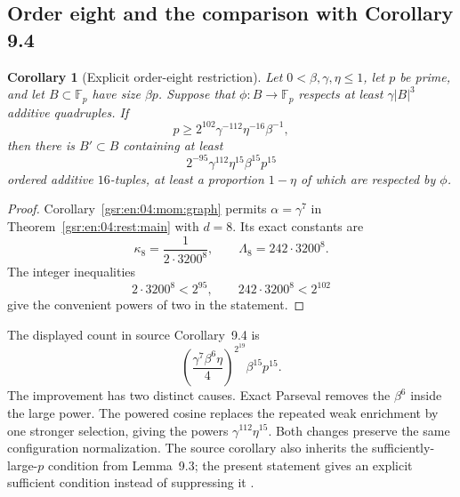 \documentclass[11pt,letterpaper]{article}
\numberwithin{equation}{section}
\newtheorem{corollary}[theorem]{Corollary}
\theoremstyle{definition}
\theoremstyle{remark}
\newcommand{\F}{\mathbb F}
\newcommand{\1}{\mathbf 1}
\newcommand{\abs}[1]{\left|#1\right|}
\begin{document}
\subsection{Order eight and the comparison with Corollary 9.4}

\begin{corollary}[Explicit order-eight restriction]
\label{gsr:en:04:rest:eight}
Let \(0<\beta,\gamma,\eta\leq1\), let \(p\) be prime, and let
\(B\subset\F_p\) have size \(\beta p\).  Suppose that
\(\phi:B\to\F_p\) respects at least
\(\gamma\abs B^3\) additive quadruples.  If
\[
 \boxed{\quad
 p\geq2^{102}\gamma^{-112}\eta^{-16}\beta^{-1},
 \quad}
 \tag{R27}
\]
then there is \(B'\subset B\) containing at least
\[
 \boxed{\quad
 2^{-95}\gamma^{112}\eta^{15}\beta^{15}p^{15}
 \quad}
 \tag{R28}
\]
ordered additive \(16\)-tuples, at least a proportion
\(1-\eta\) of which are respected by \(\phi\).
\end{corollary}

\begin{proof}
Corollary~\ref{gsr:en:04:mom:graph} permits
\(\alpha=\gamma^7\) in Theorem~\ref{gsr:en:04:rest:main} with \(d=8\).
Its exact constants are
\[
 \kappa_8=\frac1{2\cdot3200^8},\qquad
 \Lambda_8=242\cdot3200^8.
 \tag{R29}
\]
The integer inequalities
\[
 2\cdot3200^8<2^{95},\qquad
 242\cdot3200^8<2^{102}
 \tag{R30}
\]
give the convenient powers of two in the statement.
\end{proof}

The displayed count in source Corollary~9.4 is
\[
 \left(\frac{\gamma^7\beta^6\eta}{4}\right)^{2^{19}}
                  \beta^{15}p^{15}.
 \tag{R31}
\]
The improvement has two distinct causes.  Exact Parseval
removes the \(\beta^6\) inside the large power.  The powered
cosine replaces the repeated weak enrichment by one stronger
selection, giving the powers \(\gamma^{112}\eta^{15}\).
Both changes preserve the same configuration normalization.
The source corollary also inherits the sufficiently-large-\(p\)
condition from Lemma~9.3; the present statement gives an explicit
sufficient condition instead of suppressing it
\cite{gowers,repo04}.
\end{document}

